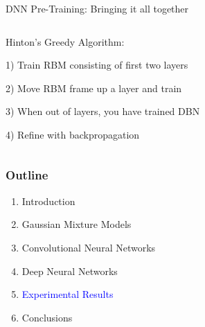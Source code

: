 \documentclass[notes]{beamer}
\begin{document}
\begin{frame}{DNN Pre-Training: Bringing it all together}
	\begin{columns}
		\begin{column}{0.45\linewidth}
			Hinton's Greedy Algorithm:
		
			\hfill
		
			1) Train RBM consisting of first two layers
			
			\hfill
			
			2) Move RBM frame up a layer and train

			\hfill 
			
			3) When out of layers, you have trained DBN
			
			\hfill
			
			4) Refine with backpropagation
		\end{column}
		\begin{column}{0.55\linewidth}
		\end{column}
	\end{columns}

\end{frame}

\begin{frame}
	\frametitle{Outline}
	
	\begin{enumerate}
		\item Introduction
		\item Gaussian Mixture Models
		\item Convolutional Neural Networks
		\item Deep Neural Networks
		\item \textcolor{blue}{Experimental Results}
		\item Conclusions
	\end{enumerate}
\end{frame}
\end{document}
